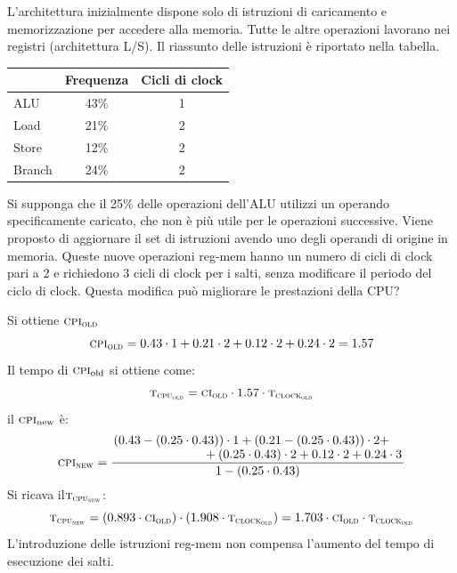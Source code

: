 \begin{exercise}
	L'architettura inizialmente dispone solo di istruzioni di caricamento e memorizzazione per accedere alla memoria. Tutte le altre operazioni lavorano nei registri (architettura L/S). Il riassunto delle istruzioni è riportato nella tabella.
	\begin{table}[ht]
		\centering
		\begin{tabular}{|l|c|c|}
			\hline
			& \textbf{Frequenza}&\textbf{Cicli di clock}
			\\\hline
			ALU & 43\% & 1
			\\\hline
			Load & 21\% & 2
			\\\hline
			Store & 12\% & 2
			\\\hline
			Branch & 24\% & 2
			\\\hline
		\end{tabular}
	\end{table}
	Si supponga che il 25\% delle operazioni dell'ALU utilizzi un operando specificamente caricato, che non è più utile per le operazioni successive. Viene proposto di aggiornare il set di istruzioni avendo uno degli operandi di origine in memoria. Queste nuove operazioni reg-mem hanno un numero di cicli di clock pari a 2 e richiedono 3 cicli di clock per i salti, senza modificare il periodo del ciclo di clock. Questa modifica può migliorare le prestazioni della CPU?
\end{exercise}
\begin{solution}
	Si ottiene $\textsc{cpi\textsubscript{old}}$
	\begin{equation*}
		\textsc{cpi\textsubscript{old}} = 0.43 \cdot 1 + 0.21 \cdot 2 + 0.12 \cdot 2 + 0.24 \cdot 2 = 1.57
	\end{equation*}
	Il tempo di $\textsc{cpi}\textsubscript{old}$ si ottiene come:
	\begin{equation*}
		\textsc{t\textsubscript{cpu\textsubscript{old}}} = \textsc{ci\textsubscript{old}} \cdot1.57 \cdot \textsc{t\textsubscript{clock\textsubscript{old}}}
	\end{equation*}
	il $\textsc{cpi}\textsubscript{new}$ è:
	\begin{equation*}
		\textsc{cpi\textsubscript{new}} = \frac{\splitfrac{(0.43-(0.25 \cdot 0.43))\cdot 1+(0.21-(0.25\cdot 0.43))\cdot 2+}{ +(0.25\cdot 0.43)\cdot 2+ 0.12 \cdot 2 + 0.24 \cdot 3}}{1-(0.25 \cdot 0.43)}
	\end{equation*}
	Si ricava il$\textsc{t\textsubscript{cpu\textsubscript{new}}}$:
	\begin{equation*}
		\textsc{t\textsubscript{cpu\textsubscript{new}}}=(0.893\cdot \textsc{ci\textsubscript{old}})\cdot(1.908 \cdot \textsc{t\textsubscript{clock\textsubscript{old}}})=1.703 \cdot \textsc{ci\textsubscript{old}} \cdot \textsc{t\textsubscript{clock\textsubscript{old}}}
	\end{equation*}
	L'introduzione delle istruzioni reg-mem non compensa l'aumento del tempo di esecuzione dei salti.
\end{solution}
